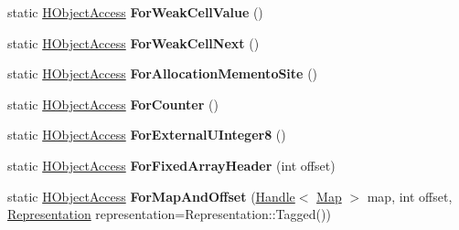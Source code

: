 \begin{DoxyCompactItemize}
\item 
static \hyperlink{classv8_1_1internal_1_1_h_object_access}{H\+Object\+Access} {\bfseries For\+Weak\+Cell\+Value} ()\hypertarget{classv8_1_1internal_1_1_h_object_access_a956084d747b2b4bac97354b61695954d}{}\label{classv8_1_1internal_1_1_h_object_access_a956084d747b2b4bac97354b61695954d}

\item 
static \hyperlink{classv8_1_1internal_1_1_h_object_access}{H\+Object\+Access} {\bfseries For\+Weak\+Cell\+Next} ()\hypertarget{classv8_1_1internal_1_1_h_object_access_aa79189b64e892e03a602d54b66867057}{}\label{classv8_1_1internal_1_1_h_object_access_aa79189b64e892e03a602d54b66867057}

\item 
static \hyperlink{classv8_1_1internal_1_1_h_object_access}{H\+Object\+Access} {\bfseries For\+Allocation\+Memento\+Site} ()\hypertarget{classv8_1_1internal_1_1_h_object_access_a99f4b5468c4d23de6a3f23b946556dd1}{}\label{classv8_1_1internal_1_1_h_object_access_a99f4b5468c4d23de6a3f23b946556dd1}

\item 
static \hyperlink{classv8_1_1internal_1_1_h_object_access}{H\+Object\+Access} {\bfseries For\+Counter} ()\hypertarget{classv8_1_1internal_1_1_h_object_access_ad578f798932f6df3dd7d80b0dada37cd}{}\label{classv8_1_1internal_1_1_h_object_access_ad578f798932f6df3dd7d80b0dada37cd}

\item 
static \hyperlink{classv8_1_1internal_1_1_h_object_access}{H\+Object\+Access} {\bfseries For\+External\+U\+Integer8} ()\hypertarget{classv8_1_1internal_1_1_h_object_access_aef23776d780b794d8d1016803492ba5f}{}\label{classv8_1_1internal_1_1_h_object_access_aef23776d780b794d8d1016803492ba5f}

\item 
static \hyperlink{classv8_1_1internal_1_1_h_object_access}{H\+Object\+Access} {\bfseries For\+Fixed\+Array\+Header} (int offset)\hypertarget{classv8_1_1internal_1_1_h_object_access_ac5157fa685df56b9f24dbb8fbb4b505c}{}\label{classv8_1_1internal_1_1_h_object_access_ac5157fa685df56b9f24dbb8fbb4b505c}

\item 
static \hyperlink{classv8_1_1internal_1_1_h_object_access}{H\+Object\+Access} {\bfseries For\+Map\+And\+Offset} (\hyperlink{classv8_1_1internal_1_1_handle}{Handle}$<$ \hyperlink{classv8_1_1internal_1_1_map}{Map} $>$ map, int offset, \hyperlink{classv8_1_1internal_1_1_representation}{Representation} representation=Representation\+::\+Tagged())\hypertarget{classv8_1_1internal_1_1_h_object_access_a2882c3143f9f0edd40512c5d04025301}{}\label{classv8_1_1internal_1_1_h_object_access_a2882c3143f9f0edd40512c5d04025301}


\end{DoxyCompactItemize}
